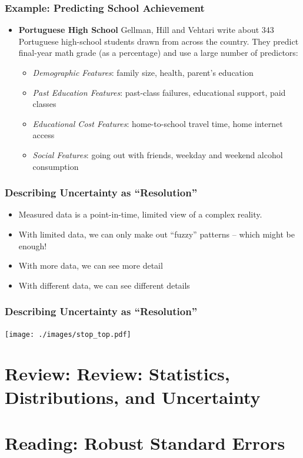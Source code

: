 \documentclass[12pt, block=fill]{beamer}
\begin{document}
\begin{frame}
  \frametitle{Example: Predicting School Achievement}
  \begin{itemize}
    \item \textbf{Portuguese High School} Gellman, Hill and Vehtari write about 343 Portuguese high-school students drawn from across the country. They predict final-year math grade (as a percentage) and use a large number of predictors:
  \begin{itemize}
    \item \textit{Demographic Features}: family size, health, parent's education
    \item \textit{Past Education Features}: past-class failures, educational support, paid classes
    \item \textit{Educational Cost Features}:  home-to-school travel time, home internet access
    \item \textit{Social Features}: going out with friends, weekday and weekend alcohol consumption
  \end{itemize}
  \end{itemize}
\end{frame}

\begin{frame}
  \frametitle{Describing Uncertainty as ``Resolution''}
  \begin{itemize}
    \item Measured data is a point-in-time, limited view of a complex reality.
    \item With limited data, we can only make out ``fuzzy'' patterns -- which might be enough!
    \item With more data, we can see more detail
    \item With different data, we can see different details
  \end{itemize}
\end{frame}

\begin{frame}
  \frametitle{Describing Uncertainty as ``Resolution''}
  \texttt{[image: ./images/stop\_top.pdf]}
\end{frame}

\section{Review: Review: Statistics, Distributions, and Uncertainty}

\section{Reading: Robust Standard Errors}
\end{document}
